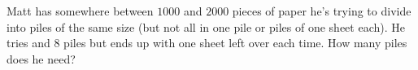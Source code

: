 Matt has somewhere between $1000$ and $2000$ pieces of paper he's trying to divide into piles of the same size (but not all in one pile or piles of one sheet each). He tries       and $8$ piles but ends up with one sheet left over each time. How many piles does he need?